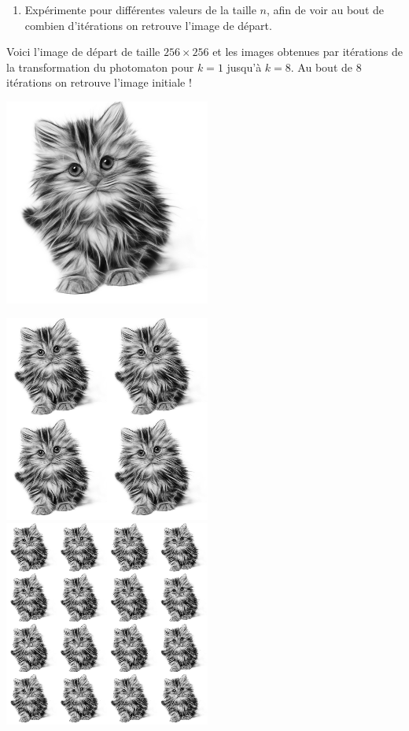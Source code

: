 \documentclass[11pt,class=report,crop=false]{standalone}
\begin{document}
\begin{activite}
\begin{enumerate}
  \item Expérimente pour différentes valeurs de la taille $n$, afin de voir au bout de combien d'itérations on retrouve l'image de départ.
  
\end{enumerate}

Voici l'image de départ de taille $256 \times 256$ et les images obtenues par itérations de la transformation du photomaton pour $k=1$ jusqu'à $k=8$. Au bout de $8$ itérations on retrouve l'image initiale !
\begin{center}
\includegraphics[scale=0.4]{images_fiche/chat_gimp_new_photo_0.png}
\end{center}
\begin{center}
\includegraphics[scale=0.3]{images_fiche/chat_gimp_new_photo_1.png}\qquad
\includegraphics[scale=0.3]{images_fiche/chat_gimp_new_photo_2.png}\qquad

\end{center}
\end{activite}
\end{document}
